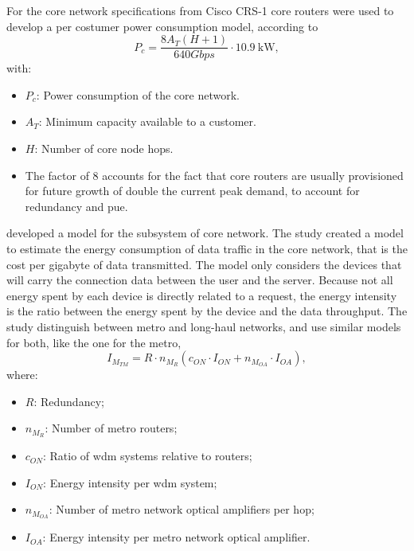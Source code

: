 For the core network specifications from Cisco CRS-1 core routers were used to develop a per costumer power consumption model, according to
%
\begin{equation}
\label{formula:baliga_core}
    P_c = \frac{8A_{T}(H + 1)}{640 Gbps} \cdot \SI{10.9}{\kilo\watt},
\end{equation}
%
with: 
\begin{itemize}
    \item $P_c$: Power consumption of the core network.
    \item $A_{T}$: Minimum capacity available to a customer.
    \item $H$: Number of core node hops.
    \item The factor of 8 accounts for the fact that core routers are usually provisioned for future growth of double the current peak demand, to account for redundancy and \ac{pue}.
\end{itemize}

 
\citet{Schien2015} developed a model for the subsystem of core network. The study created a model to estimate the energy consumption of data traffic in the core network, that is the cost per \ac{gigabyte} of data transmitted. 
The model only considers the devices that will carry the connection data between the user and the server. Because not all energy spent by each device is directly related to a request, the energy intensity is the ratio between the energy spent by the device and the data throughput. The study distinguish between metro and long-haul networks, and use similar models for both, like the one for the metro,
%
\begin{equation}
\label{formula:schien_core_metro}
    I_{M_{TM}} = R \cdot n_{M_R} (c_{ON} \cdot I_{ON} + n_{M_{OA}} \cdot I_{OA}),
\end{equation}
%
where:
\begin{itemize}
    \item $R$: Redundancy;
    \item $n_{M_R}$: Number of metro routers;
    \item $c_{ON}$: Ratio of \ac{wdm} systems relative to routers;
    \item $I_{ON}$: Energy intensity per \ac{wdm} system;
    \item $n_{M_{OA}}$: Number of metro network optical amplifiers per hop;
    \item $I_{OA}$: Energy intensity per metro network optical amplifier.
\end{itemize}



